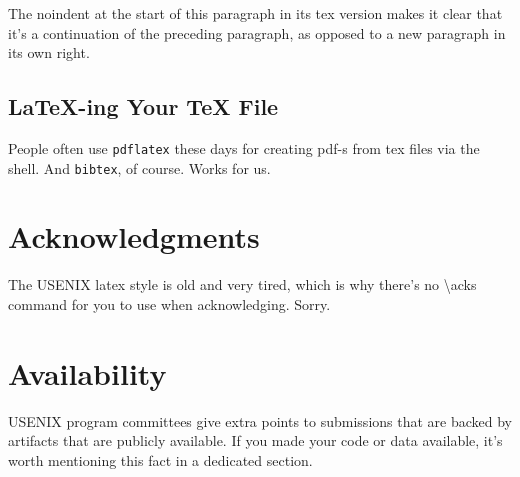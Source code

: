 \documentclass[a4paper,10pt,titlepage]{article}
\begin{document}
\noindent
The noindent at the start of this paragraph in its tex version makes
it clear that it's a continuation of the preceding paragraph, as
opposed to a new paragraph in its own right.


\subsection{LaTeX-ing Your TeX File}

People often use \texttt{pdflatex} these days for creating pdf-s from
tex files via the shell. And \texttt{bibtex}, of course. Works for us.

\section*{Acknowledgments}

The USENIX latex style is old and very tired, which is why
there's no \textbackslash{}acks command for you to use when
acknowledging. Sorry.

\section*{Availability}

USENIX program committees give extra points to submissions that are
backed by artifacts that are publicly available. If you made your code
or data available, it's worth mentioning this fact in a dedicated
section.



\end{document}
